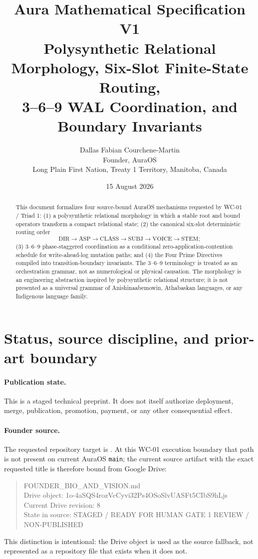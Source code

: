 \documentclass[11pt]{article}
\title{Aura Mathematical Specification V1\\
\large Polysynthetic Relational Morphology, Six-Slot Finite-State Routing,\\
3--6--9 WAL Coordination, and Boundary Invariants}
\author{Dallas Fabian Courchene-Martin\\Founder, AuraOS\\Long Plain First Nation, Treaty 1 Territory, Manitoba, Canada}
\date{15 August 2026}
\begin{document}
\maketitle

\begin{abstract}
This document formalizes four source-bound AuraOS mechanisms requested by WC-01 / Triad 1:
(1) a polysynthetic relational morphology in which a stable root and bound operators transform a compact relational state;
(2) the canonical six-slot deterministic routing order
\[
\mathrm{DIR}\rightarrow\mathrm{ASP}\rightarrow\mathrm{CLASS}\rightarrow
\mathrm{SUBJ}\rightarrow\mathrm{VOICE}\rightarrow\mathrm{STEM};
\]
(3) 3--6--9 phase-staggered coordination as a conditional zero-application-contention schedule for write-ahead-log mutation paths; and
(4) the Four Prime Directives compiled into transition-boundary invariants.
The 3--6--9 terminology is treated as an orchestration grammar, not as numerological or physical causation. The morphology is an engineering abstraction inspired by polysynthetic relational structure; it is not presented as a universal grammar of Anishinaabemowin, Athabaskan languages, or any Indigenous language family.
\end{abstract}

\section*{Status, source discipline, and prior-art boundary}

\paragraph{Publication state.}
This is a staged technical preprint. It does not itself authorize deployment, merge, publication, promotion, payment, or any other consequential effect.

\paragraph{Founder source.}
The requested repository target is
.
At this WC-01 execution boundary that path is not present on current AuraOS \texttt{main}; the current source artifact with the exact requested title is therefore bound from Google Drive:
\begin{quote}\small\ttfamily
FOUNDER\_BIO\_AND\_VISION.md\\
Drive object: 1o-4aSQS4rozVcCyvi32Ps4OSoSlvUASFt5CIbS9hLjs\\
Current Drive revision: 8\\
State in source: STAGED / READY FOR HUMAN GATE 1 REVIEW / NON-PUBLISHED
\end{quote}
This distinction is intentional: the Drive object is used as the source fallback, not represented as a repository file that exists when it does not.
\end{document}
